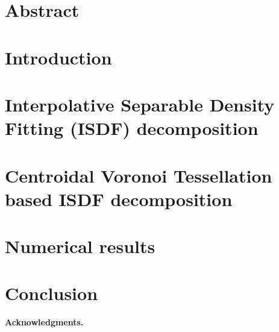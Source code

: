\section{Abstract}\label{cvtsec:abs}
	

\section{Introduction}\label{cvtsec:int}
	

\section{Interpolative Separable Density Fitting (ISDF) decomposition}
	\label{cvtsec:bac}
	

\section{Centroidal Voronoi Tessellation based ISDF decomposition}
	\label{cvtsec:met}
	

\section{Numerical results}\label{cvtsec:num}
	

\section{Conclusion}\label{cvtsec:con}
	
	
\vfill
\noindent\textbf{Acknowledgments.} 